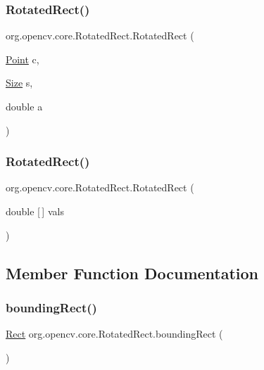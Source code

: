 \subsubsection{\texorpdfstring{Rotated\+Rect()}{RotatedRect()}\hspace{0.1cm}{\footnotesize\ttfamily [2/3]}}
{\footnotesize\ttfamily org.\+opencv.\+core.\+Rotated\+Rect.\+Rotated\+Rect (\begin{DoxyParamCaption}\item[{\mbox{\hyperlink{classorg_1_1opencv_1_1core_1_1_point}{Point}}}]{c,  }\item[{\mbox{\hyperlink{classorg_1_1opencv_1_1core_1_1_size}{Size}}}]{s,  }\item[{double}]{a }\end{DoxyParamCaption})}

\mbox{\label{classorg_1_1opencv_1_1core_1_1_rotated_rect_a315676cbfda3a7cc1b96467bffad1059}} 
\subsubsection{\texorpdfstring{Rotated\+Rect()}{RotatedRect()}\hspace{0.1cm}{\footnotesize\ttfamily [3/3]}}
{\footnotesize\ttfamily org.\+opencv.\+core.\+Rotated\+Rect.\+Rotated\+Rect (\begin{DoxyParamCaption}\item[{double \mbox{[}$\,$\mbox{]}}]{vals }\end{DoxyParamCaption})}



\subsection{Member Function Documentation}
\mbox{\label{classorg_1_1opencv_1_1core_1_1_rotated_rect_a2d0d8f49a786e5f15673e699659ee0b7}} 
\subsubsection{\texorpdfstring{bounding\+Rect()}{boundingRect()}}
{\footnotesize\ttfamily \mbox{\hyperlink{classorg_1_1opencv_1_1core_1_1_rect}{Rect}} org.\+opencv.\+core.\+Rotated\+Rect.\+bounding\+Rect (\begin{DoxyParamCaption}{ }\end{DoxyParamCaption})}

